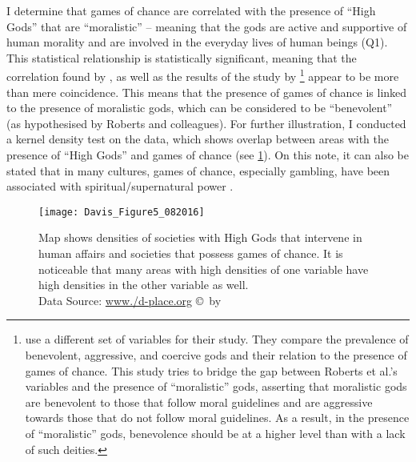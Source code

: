 I determine that games of chance are correlated with the presence of ``High Gods” that are ``moralistic” – meaning that the gods are active and supportive of human morality and are involved in the everyday lives of human beings (Q1). This statistical relationship is statistically significant, meaning that the correlation found by \textcite{ball1972}, as well as the results of the study by \textcite{roberts1959}\footnote{\textcite{roberts1959} use a different set of variables for their study. They compare the prevalence of benevolent, aggressive, and coercive gods and their relation to the presence of games of chance. This study tries to bridge the gap between Roberts et al.’s variables and the presence of ``moralistic” gods, asserting that moralistic gods are benevolent to those that follow moral guidelines and are aggressive towards those that do not follow moral guidelines. As a result, in the presence of ``moralistic” gods, benevolence should be at a higher level than with a lack of such deities.}  appear to be more than mere coincidence. This means that the presence of games of chance is linked to the presence of moralistic gods, which can be considered to be ``benevolent” (as hypothesised by Roberts and colleagues). For further illustration, I conducted a kernel density test on the data, which shows overlap between areas with the presence of ``High Gods” and games of chance (see \cref{fig:Figure5_Davis_082016}). On this note, it can also be stated that in many cultures, games of chance, especially gambling, have been associated with spiritual/supernatural power \parencites[22]{binde2005}[147]{binde2007}.

\begin{figure}[!htb] %
	\texttt{[image: Davis\_Figure5\_082016]}
	\caption{Map shows densities of societies with High Gods that intervene in human affairs and societies that possess games of chance. It is noticeable that many areas with high densities of one variable have high densities in the other variable as well.
	{\normalfont\scriptsize \\ Data Source: \href{http:/www./d-place.org}{www./d-place.org} \copyright\ by 
                 \shortauthor
                  }}
	\label{fig:Figure5_Davis_082016}
\end{figure}

